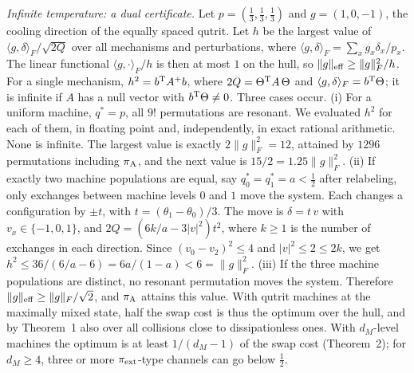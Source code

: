 \documentclass[aps,prl,reprint,superscriptaddress,amsmath,amssymb]{revtex4-2}
\begin{document}
\emph{Infinite temperature: a dual certificate.} Let $p=(\tfrac13,\tfrac13,\tfrac13)$ and $g=(1,0,-1)$, the cooling
direction of the equally spaced qutrit. Let $h$ be the largest value of $\langle g,\delta\rangle_F/\sqrt{2Q}$ over all
mechanisms and perturbations, where $\langle g,\delta\rangle_F=\sum_xg_x\delta_x/p_x$. The linear functional
$\langle g,\cdot\rangle_F/h$ is then at most $1$ on the hull, so $\|g\|_{\rm eff}\geq\|g\|_F^2/h$. For a single
mechanism, $h^2=b^{\rm T}A^+b$, where $2Q=\Theta^{\rm T}A\,\Theta$ and $\langle g,\delta\rangle_F=b^{\rm T}\Theta$; it is
infinite if $A$ has a null vector with $b^{\rm T}\Theta\neq0$. Three cases occur. (i) For a uniform machine, $q^*=p$,
all $9!$ permutations are resonant. We evaluated $h^2$ for each of them, in floating point and, independently, in exact
rational arithmetic. None is infinite. The largest value is exactly $2\|g\|_F^2=12$, attained by $1296$ permutations
including $\pi_{\rm A}$, and the next value is $15/2=1.25\|g\|_F^2$. (ii) If exactly two machine populations are equal,
say $q^*_0=q^*_1=a<\tfrac12$ after relabeling, only exchanges between machine levels $0$ and $1$ move the system. Each
changes a configuration by $\pm t$, with $t=(\theta_1-\theta_0)/3$. The move is $\delta=t\,v$ with $v_x\in\{-1,0,1\}$,
and $2Q=(6k/a-3|v|^2)t^2$, where $k\geq1$ is the number of exchanges in each direction. Since $(v_0-v_2)^2\leq4$ and
$|v|^2\leq2\leq2k$, we get $h^2\leq36/(6/a-6)=6a/(1-a)<6=\|g\|_F^2$. (iii) If the three machine populations are
distinct, no resonant permutation moves the system. Therefore $\|g\|_{\rm eff}\geq\|g\|_F/\sqrt2$, and $\pi_{\rm A}$
attains this value. With qutrit machines at the maximally mixed state, half the swap cost is thus the optimum over the
hull, and by Theorem~1 also over all collisions close to dissipationless ones. With $d_M$-level machines the optimum is
at least $1/(d_M-1)$ of the swap cost (Theorem~2); for $d_M\geq4$, three or more $\pi_{\rm ext}$-type channels can go
below $\tfrac12$.
\end{document}
